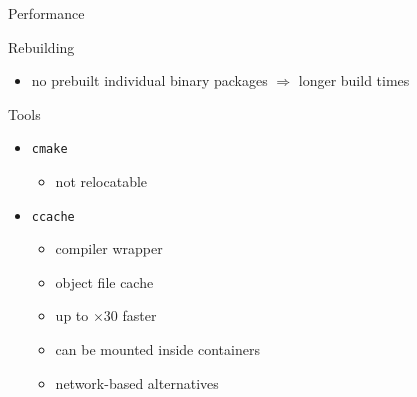 \documentclass[hyperref={colorlinks=false, breaklinks=true},11pt]{beamer}
\begin{document}
\begin{frame}{Performance}
    \begin{block}{Rebuilding}
        \begin{itemize}
            \item no prebuilt individual binary packages $\Rightarrow$
                longer build times
        \end{itemize}
    \end{block}

    \begin{block}{Tools}
        \begin{itemize}
            \item \texttt{cmake}
                \begin{itemize}
                    \item not relocatable
                \end{itemize}
            \item \texttt{ccache}
                \begin{itemize}
                    \item compiler wrapper
                    \item object file cache
                    \item up to $\times30$ faster
                    \item can be mounted inside containers
                    \item network-based alternatives
                \end{itemize}
        \end{itemize}
    \end{block}
\end{frame}
\end{document}
